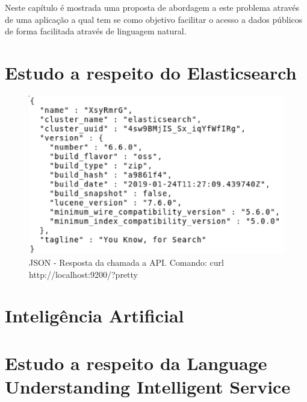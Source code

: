 Neste capítulo é mostrada uma proposta de abordagem a este problema através de uma aplicação a qual tem se como objetivo facilitar o acesso a dados públicos de forma facilitada através de linguagem natural.

\section{Estudo a respeito do Elasticsearch}


\begin{figure}[!htb]
	\caption{\label{pretty}JSON - Resposta da chamada a API. Comando: curl http://localhost:9200/?pretty}
	\begin{center}
		\includegraphics[width=\textwidth]{imagens/pretty.eps}
	\end{center}
\end{figure}

\section{Inteligência Artificial}


\section{Estudo a respeito da Language Understanding Intelligent Service}

